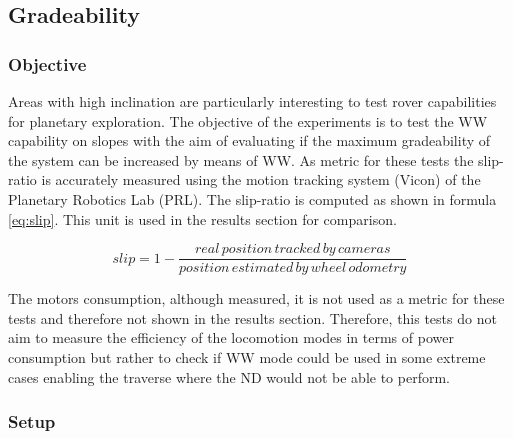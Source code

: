 \documentclass[a4paper,twocolumn]{esapub2005} %
\begin{document}

\subsection{Gradeability}

\subsubsection{Objective}
Areas with high inclination are particularly interesting to test rover
capabilities for planetary exploration. The objective of the experiments is to
test the WW capability on slopes with the aim of evaluating if the maximum
gradeability of the system can be increased by means of WW. As metric for these
tests the slip-ratio is accurately measured using the motion tracking
system (Vicon) of the Planetary Robotics Lab (PRL). The slip-ratio is
computed as shown in formula \ref{eq:slip}. This unit is used in the
results section for comparison.

\begin{equation} slip = 1- \frac{real\, position\, tracked\, by\,
cameras}{position\, estimated\, by\, wheel\, odometry} \label{eq:slip}
\end{equation}

The motors consumption, although measured, it is not used as a metric for these
tests and therefore not shown in the results section. Therefore, this tests do
not aim to measure the efficiency of the locomotion modes in terms of power
consumption but rather to check if WW mode could be used in some extreme cases
enabling the traverse where the ND would not be able to
perform\footnotemark[3].


\subsubsection{Setup}
\end{document}
